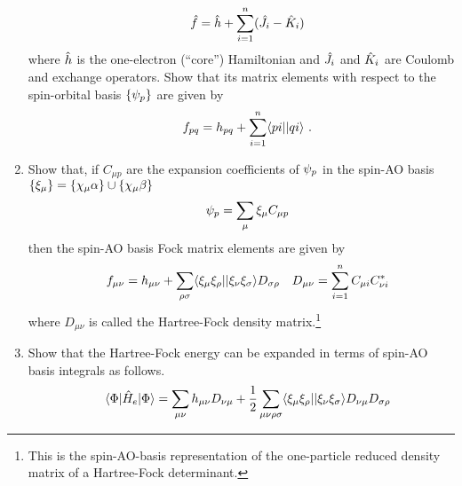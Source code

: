 \documentclass[fleqn,11pt]{article}
\begin{document}
\begin{enumerate}
\begin{align}
&&
  \hat{f}
=
  \hat{h}
+
  \sum_{i=1}^n
  (\hat{J}_i - \hat{K}_i)
\end{align}
  where $\hat{h}$ is the one-electron (``core'') Hamiltonian and $\hat{J}_i$ and $\hat{K}_i$ are Coulomb and exchange operators.
  Show that its matrix elements with respect to the spin-orbital basis $\{\psi_p\}$ are given by
\begin{align}
&&
  f_{pq}
=
  h_{pq}
+
  \sum_{i=1}^n
  \langle pi||qi\rangle\ .
\end{align}
  \item 
  Show that, if $C_{\mu p}$ are the expansion coefficients of $\psi_p$ in the spin-AO basis $\{\xi_\mu\}=\{\chi_\mu\alpha\}\cup\{\chi_\mu\beta\}$
\begin{align}
&&
  \psi_p
=
  \sum_\mu \xi_\mu C_{\mu p}
\end{align}
  then the spin-AO basis Fock matrix elements are given by
\begin{align}
&&
  f_{\mu\nu}
=
  h_{\mu\nu}
+
  \sum_{\rho\sigma}
  \langle\xi_\mu\xi_\rho||\xi_\nu\xi_\sigma\rangle D_{\sigma\rho}
&&
  D_{\mu\nu}
=
  \sum_{i=1}^n
  C_{\mu i}C_{\nu i}^*
\end{align}
  where $D_{\mu\nu}$ is called the Hartree-Fock density matrix.\footnote{This is the spin-AO-basis representation of the one-particle reduced density matrix of a Hartree-Fock determinant.}
\item Show that the Hartree-Fock energy can be expanded in terms of spin-AO basis integrals as follows.
\begin{align}
&&
  \langle\Phi|\hat{H}_e|\Phi\rangle
=
  \sum_{\mu\nu}
  h_{\mu\nu}D_{\nu\mu}
+
  \dfrac{1}{2}
  \sum_{\mu\nu\rho\sigma}
  \langle\xi_\mu\xi_\rho||\xi_\nu\xi_\sigma\rangle
  D_{\nu\mu}D_{\sigma\rho}
\end{align}
\end{enumerate}
\end{document}
